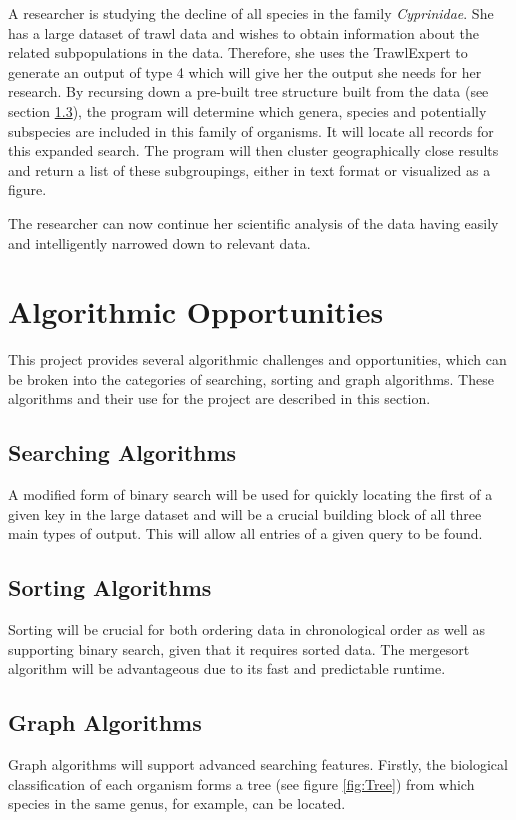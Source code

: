 \documentclass{article}
\begin{document}
A researcher is studying the decline of all species in the family \textit{Cyprinidae}. She has a large dataset of trawl data and wishes to obtain information about the related subpopulations in the data. Therefore, she uses the TrawlExpert to generate an output of type 4 which will give her the output she needs for her research. By recursing down a pre-built tree structure built from the data (see section \ref{sec:graphalgs}), the program will determine which genera, species and potentially subspecies are included in this family of organisms. It will locate all records for this expanded search. The program will then cluster geographically close results and return a list of these subgroupings, either in text format or visualized as a figure.

The researcher can now continue her scientific analysis of the data having easily and intelligently narrowed down to relevant data.

\section{Algorithmic Opportunities}
This project provides several algorithmic challenges and opportunities, which can be broken into the categories of searching, sorting and graph algorithms. These algorithms and their use for the project are described in this section.

\subsection{Searching Algorithms}
A modified form of binary search will be used for quickly locating the first of a given key in the large dataset and will be a crucial building block of all three main types of output. This will allow all entries of a given query to be found.

\subsection{Sorting Algorithms}
Sorting will be crucial for both ordering data in chronological order as well as supporting binary search, given that it requires sorted data. The mergesort algorithm will be advantageous due to its fast and predictable runtime.

\subsection{Graph Algorithms}\label{sec:graphalgs}
Graph algorithms will support advanced searching features. Firstly, the biological classification of each organism forms a tree (see figure \ref{fig:Tree}) from which species in the same genus, for example, can be located. 
\end{document}

